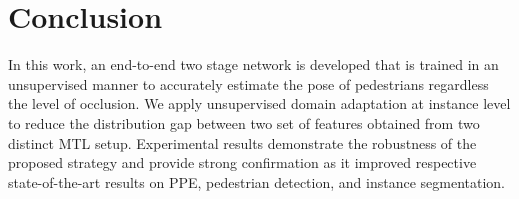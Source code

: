 \documentclass[a4paper,11pt]{article}
\begin{document}
\section{Conclusion}
In this work, an end-to-end two stage network is developed that is trained in an unsupervised manner to accurately estimate the pose of pedestrians regardless the level of occlusion. We apply unsupervised domain adaptation at instance level to reduce the distribution gap between two set of features obtained from two distinct MTL setup. Experimental results demonstrate the robustness of the proposed strategy and provide strong confirmation as it improved respective state-of-the-art results on PPE, pedestrian detection, and instance segmentation. 




\begingroup
\let\section\subsubsection
\makeatletter
\renewcommand\@openbib@code{\itemsep\z@}
\makeatother


\endgroup
\end{document}
